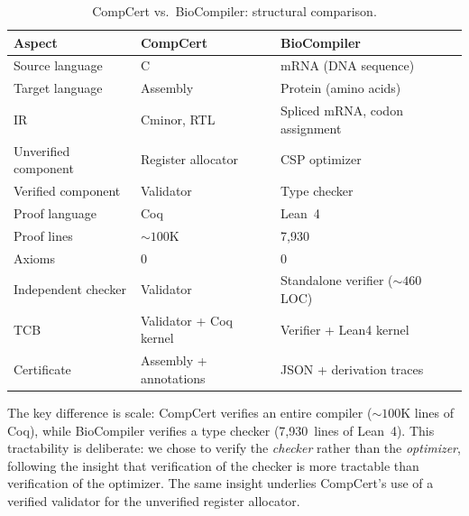 \documentclass[sigplan,10pt,manuscript,review,anonymous]{acmart}
\begin{document}
\begin{table}[t]
\centering
\caption{CompCert vs.\ BioCompiler: structural comparison.}
\label{tab:compcert}
\begin{tabular}{lll}
\toprule
\textbf{Aspect} & \textbf{CompCert} & \textbf{BioCompiler} \\
\midrule
Source language & C & mRNA (DNA sequence) \\
Target language & Assembly & Protein (amino acids) \\
IR & Cminor, RTL & Spliced mRNA, codon assignment \\
Unverified component & Register allocator & CSP optimizer \\
Verified component & Validator & Type checker \\
Proof language & Coq & Lean~4 \\
Proof lines & ${\sim}100$K & 7{,}930 \\
Axioms & 0 & 0 \\
Independent checker & Validator & Standalone verifier (${\sim}460$ LOC) \\
TCB & Validator + Coq kernel & Verifier + Lean4 kernel \\
Certificate & Assembly + annotations & JSON + derivation traces \\
\bottomrule
\end{tabular}
\end{table}

The key difference is scale: CompCert verifies an entire compiler
(${\sim}100$K lines of Coq), while BioCompiler verifies a type checker
(7{,}930~lines of Lean~4).
This tractability is deliberate: we chose to verify the \emph{checker}
rather than the \emph{optimizer}, following the insight that
verification of the checker is more tractable than verification of the
optimizer.
The same insight underlies CompCert's use of a verified validator for
the unverified register allocator.
\end{document}
